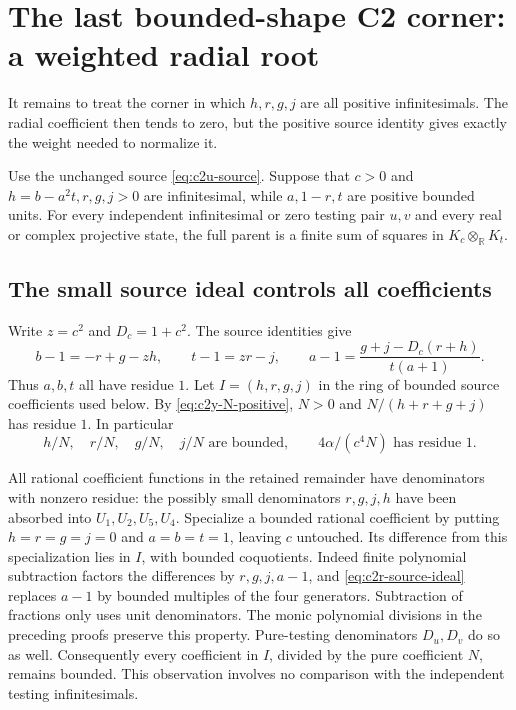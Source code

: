\section{The last bounded-shape C2 corner: a weighted radial root}
\label{sec:c2-radial-corner}

It remains to treat the corner in which $h,r,g,j$ are all positive
infinitesimals.  The radial coefficient then tends to zero, but the
positive source identity gives exactly the weight needed to normalize it.

\begin{theorem}
\label{thm:c2-radial-corner}
Use the unchanged source \eqref{eq:c2u-source}.  Suppose that $c>0$ and
$h=b-a^2t,r,g,j>0$ are infinitesimal, while $a,1-r,t$ are positive
bounded units.  For every independent infinitesimal or zero testing pair
$u,v$ and every real or complex projective state, the full parent is a
finite sum of squares in $K_c\otimes_{\mathbb R}K_t$.
\end{theorem}

\subsection{The small source ideal controls all coefficients}
Write $z=c^2$ and $D_c=1+c^2$.  The source identities give
\begin{equation}
b-1=-r+g-zh,\qquad t-1=zr-j,\qquad
a-1=\frac{g+j-D_c(r+h)}{t(a+1)}.
\label{eq:c2r-source-ideal}
\end{equation}
Thus $a,b,t$ all have residue $1$.  Let $I=(h,r,g,j)$ in the ring of
bounded source coefficients used below.  By
\eqref{eq:c2y-N-positive}, $N>0$ and $N/(h+r+g+j)$ has residue $1$.
In particular
\begin{equation}
h/N,\quad r/N,\quad g/N,\quad j/N
\text{ are bounded},\qquad
4\alpha/(c^4N)\text{ has residue }1.
\label{eq:c2r-weight-bounds}
\end{equation}

All rational coefficient functions in the retained remainder have
denominators with nonzero residue: the possibly small denominators
$r,g,j,h$ have been absorbed into $U_1,U_2,U_5,U_4$.  Specialize a
bounded rational coefficient by putting $h=r=g=j=0$ and $a=b=t=1$,
leaving $c$ untouched.  Its difference from this specialization lies in
$I$, with bounded coquotients.  Indeed finite polynomial subtraction
factors the differences by $r,g,j,a-1$, and
\eqref{eq:c2r-source-ideal} replaces $a-1$ by bounded multiples of the
four generators.  Subtraction of fractions only uses unit denominators.
The monic polynomial divisions in the preceding proofs preserve this
property.  Pure-testing denominators $D_u,D_v$ do so as well.
Consequently every coefficient in $I$, divided by the pure coefficient
$N$, remains bounded.  This observation involves no comparison with
the independent testing infinitesimals.

